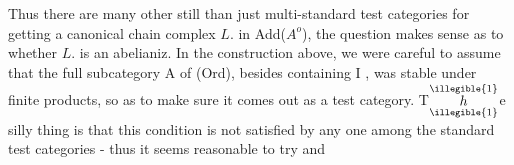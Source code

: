 Thus there are many other  still than just multi-standard
test categories for getting a canonical chain complex $L.$ in Add($A^o$),
  the question makes sense as to whether $L.$ is an abelianiz.
In the construction above, we were careful to assume that the full
subcategory  A of (Ord), besides containing I , was stable under
finite products, so as to make sure it comes out as a test category.
T$\overset{\illegible{1}}{\underset{\illegible{1}}{h}}$e silly thing is that this condition is not satisfied by any one among
the standard test categories - thus it seems reasonable to try and


